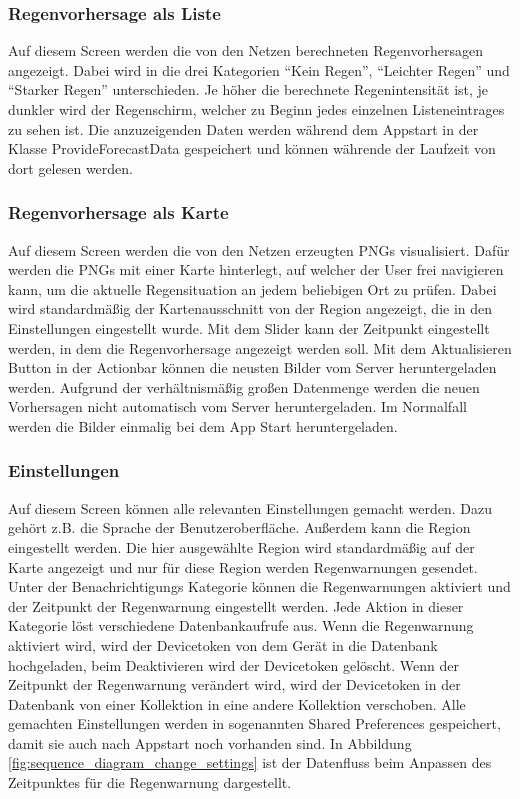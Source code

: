 \subsubsection*{Regenvorhersage als Liste}
Auf diesem Screen werden die von den Netzen berechneten Regenvorhersagen angezeigt. 
Dabei wird in die drei Kategorien “Kein Regen”, “Leichter Regen” und “Starker Regen” unterschieden. 
Je höher die berechnete Regenintensität ist, je dunkler wird der Regenschirm, welcher zu Beginn jedes einzelnen Listeneintrages zu sehen ist.   
Die anzuzeigenden Daten werden während dem Appstart in der Klasse ProvideForecastData gespeichert und können währende der Laufzeit
von dort gelesen werden.

\subsubsection*{Regenvorhersage als Karte}
Auf diesem Screen werden die von den Netzen erzeugten PNGs visualisiert. 
Dafür werden die PNGs mit einer Karte hinterlegt, auf welcher der User frei navigieren kann, 
um die aktuelle Regensituation an jedem beliebigen Ort zu prüfen. 
Dabei wird standardmäßig der Kartenausschnitt von der Region angezeigt, die in den Einstellungen eingestellt wurde. 
Mit dem Slider kann der Zeitpunkt eingestellt werden, in dem die Regenvorhersage angezeigt werden soll. 
Mit dem Aktualisieren Button in der Actionbar können die neusten Bilder vom Server heruntergeladen werden. 
Aufgrund der verhältnismäßig großen Datenmenge werden die neuen Vorhersagen nicht automatisch vom Server heruntergeladen. 
Im Normalfall werden die Bilder einmalig bei dem App Start heruntergeladen.

\subsubsection*{Einstellungen}
Auf diesem Screen können alle relevanten Einstellungen gemacht werden. Dazu gehört z.B. die Sprache der Benutzeroberfläche. 
Außerdem kann die Region eingestellt werden. 
Die hier ausgewählte Region wird standardmäßig auf der Karte angezeigt und nur für diese Region werden Regenwarnungen gesendet. 
Unter der Benachrichtigungs Kategorie können die Regenwarnungen aktiviert und der Zeitpunkt der Regenwarnung eingestellt werden. 
Jede Aktion in dieser Kategorie löst verschiedene Datenbankaufrufe aus. 
Wenn die Regenwarnung aktiviert wird, wird der Devicetoken von dem Gerät in die Datenbank hochgeladen, beim Deaktivieren wird der Devicetoken gelöscht. 
Wenn der Zeitpunkt der Regenwarnung verändert wird, wird der Devicetoken in der Datenbank von einer Kollektion in eine andere Kollektion verschoben.   
Alle gemachten Einstellungen werden in sogenannten Shared Preferences gespeichert, damit sie auch nach Appstart noch vorhanden sind.   
In Abbildung \ref*{fig:sequence_diagram_change_settings} ist der Datenfluss beim Anpassen des Zeitpunktes für die Regenwarnung 
dargestellt. 

